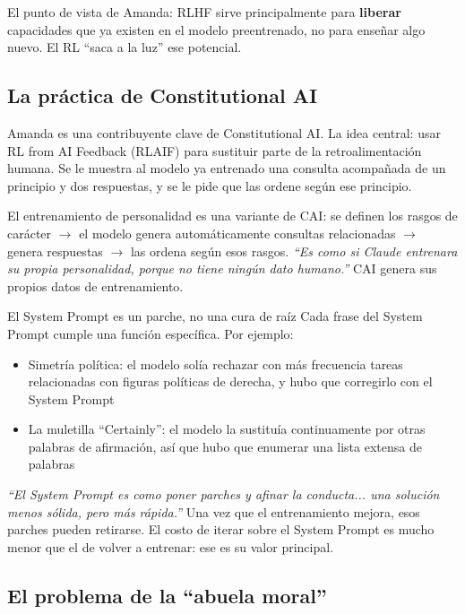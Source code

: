 \documentclass[a4paper]{article}
\begin{document}
El punto de vista de Amanda: RLHF sirve principalmente para \textbf{liberar} capacidades que ya existen en el modelo preentrenado, no para enseñar algo nuevo. El RL ``saca a la luz'' ese potencial.

\subsection{La práctica de Constitutional AI}

Amanda es una contribuyente clave de Constitutional AI. La idea central: usar RL from AI Feedback (RLAIF) para sustituir parte de la retroalimentación humana. Se le muestra al modelo ya entrenado una consulta acompañada de un principio y dos respuestas, y se le pide que las ordene según ese principio.

El entrenamiento de personalidad es una variante de CAI: se definen los rasgos de carácter $\to$ el modelo genera automáticamente consultas relacionadas $\to$ genera respuestas $\to$ las ordena según esos rasgos. \textit{``Es como si Claude entrenara su propia personalidad, porque no tiene ningún dato humano.''} CAI genera sus propios datos de entrenamiento.

\begin{warningbox}{El System Prompt es un parche, no una cura de raíz}
Cada frase del System Prompt cumple una función específica. Por ejemplo:
\begin{itemize}
    \item Simetría política: el modelo solía rechazar con más frecuencia tareas relacionadas con figuras políticas de derecha, y hubo que corregirlo con el System Prompt
    \item La muletilla ``Certainly'': el modelo la sustituía continuamente por otras palabras de afirmación, así que hubo que enumerar una lista extensa de palabras
\end{itemize}

\textit{``El System Prompt es como poner parches y afinar la conducta... una solución menos sólida, pero más rápida.''} Una vez que el entrenamiento mejora, esos parches pueden retirarse. El costo de iterar sobre el System Prompt es mucho menor que el de volver a entrenar: ese es su valor principal.
\end{warningbox}

\subsection{El problema de la ``abuela moral''}
\end{document}
